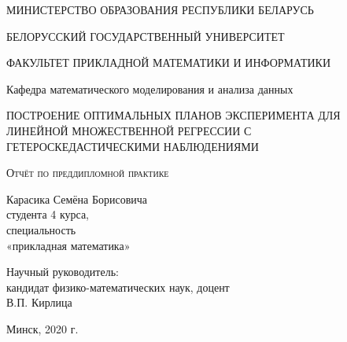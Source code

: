 \begin{titlepage}
	\begin{center}
		\large
		МИНИСТЕРСТВО ОБРАЗОВАНИЯ РЕСПУБЛИКИ БЕЛАРУСЬ
		
		\vspace{0.5cm}
		
		БЕЛОРУССКИЙ ГОСУДАРСТВЕННЫЙ УНИВЕРСИТЕТ
		\vspace{0.5cm}
		
		ФАКУЛЬТЕТ ПРИКЛАДНОЙ МАТЕМАТИКИ И ИНФОРМАТИКИ
		
		\vspace{0.25cm}
		
		Кафедра математического моделирования и анализа данных
		\vfill
		
		{\LARGE ПОСТРОЕНИЕ ОПТИМАЛЬНЫХ ПЛАНОВ ЭКСПЕРИМЕНТА ДЛЯ ЛИНЕЙНОЙ МНОЖЕСТВЕННОЙ РЕГРЕССИИ С ГЕТЕРОСКЕДАСТИЧЕСКИМИ  НАБЛЮДЕНИЯМИ}
		\bigskip
		
		\textsc{Отчёт по преддипломной практике}\\
	\end{center}
	\vfill
	
	\newlength{\ML}
	\hfill\begin{minipage}{0.5\textwidth}
		Карасика Семёна Борисовича\\
		студента 4 курса,\\
		специальность\\
		«прикладная математика»\\
	\end{minipage}%
	\bigskip
	
	\hfill\begin{minipage}{0.5\textwidth}
		Научный руководитель:\\
		кандидат физико-математических наук, доцент\\В.П. Кирлица
	\end{minipage}%
	\vfill
	
	\begin{center}
		Минск, 2020 г.
	\end{center}
\end{titlepage}